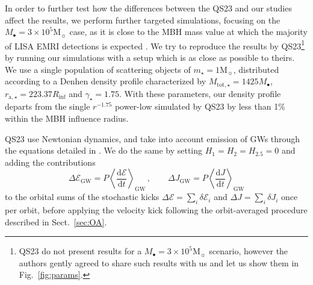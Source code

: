 \documentclass[desactivate]{aa}
\newcommand{\mb}[1]{\textcolor{green}{MB: #1}}
\newcommand{\mbout}[1]{\textcolor{green}{MB: \sout{#1}}}
\begin{document}
        In order to further test how the differences between the QS23 and our studies affect the results, we perform further targeted simulations, focusing on the $M_\bullet = 3 \times 10^5 \mathrm{M}_\sun$ case, as it is close to the MBH mass value at which the majority of LISA EMRI detections is expected
        \citep{2017PhRvD..95j3012B}. We try to reproduce the results by QS23\footnote{QS23 do not present results for a $M_\bullet = 3 \times 10^5 \mathrm{M}_\sun$ scenario, however the authors gently agreed to share such results with us and let us show them in Fig.\ \ref{fig:params}.} by running our simulations with a setup which is as close as possible to theirs.        
        We use a single population of scattering objects of $m_\star = 1 \mathrm{M}_\sun$, distributed according to a Denhen density profile characterized by $M_{\mathrm{tot},\star} = 1425 M_\bullet$, $r_{\mathrm{a},\star} = 223.37 R_\mathrm{inf}$ and $\gamma_\star = 1.75$. With these parameters, our density profile departs from the single $r^{-1.75}$ power-low simulated by QS23 by less than 1\% within the MBH influence radius.     

        QS23 use Newtonian dynamics, and take into account emission of GWs through the equations detailed in \citet{1964PhRv..136.1224P}. We do the same by setting $H_1 = H_2 = H_{2.5} = 0$ and adding the contributions
        \begin{equation}
            \Delta \mathcal{E}_\mathrm{GW} = P \left\langle \frac{\mathrm{d}\mathcal{E}}{\mathrm{d}t } \right\rangle_\mathrm{GW} \, , \qquad \Delta J_\mathrm{GW} = P \left\langle \frac{\mathrm{d}J}{\mathrm{d}t } \right\rangle_\mathrm{GW}
        \end{equation}
        to the orbital sums of the stochastic kicks $\Delta \mathcal{E} = \sum_i \delta \mathcal{E}_i$ and $\Delta J = \sum_i \delta J_i$ once per orbit, before applying the velocity kick following the orbit-averaged procedure described in Sect.\ \ref{sec:OA}.
\end{document}
